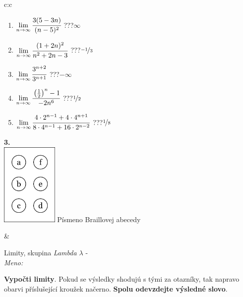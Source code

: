 \documentclass[10pt]{report}
\begin{document}
\begin{tabular}{c:c}
\begin{minipage}[c][104.5mm][t]{0.5\linewidth}
\begin{center}
\begin{minipage}{0.79\linewidth}
\begin{center}
\begin{varwidth}{\linewidth}
\begin{enumerate}
\item $\lim\limits_{n\to\infty}\cfrac{3(5-3n)}{(n-5)^2}$\quad \dotfill\; ???\;\dotfill \quad $\infty$
\item $\lim\limits_{n\to\infty}\cfrac{(1+2n)^2}{n^2+2n-3}$\quad \dotfill\; ???\;\dotfill \quad $\nicefrac{-1}{3}$
\item $\lim\limits_{n\to\infty}\cfrac{3^{n+2}}{3^{n+1}}$\quad \dotfill\; ???\;\dotfill \quad $-\infty$
\item $\lim\limits_{n\to\infty}\cfrac{\left(\frac{1}{2}\right)^n -1}{-2n^{6}}$\quad \dotfill\; ???\;\dotfill \quad $\nicefrac{1}{2}$
\item $\lim\limits_{n\to\infty}\cfrac{4\cdot 2^{n-1}+4\cdot 4^{n+1}}{8\cdot 4^{n-1}+16\cdot 2^{n-2}}$\quad \dotfill\; ???\;\dotfill \quad $\nicefrac{1}{8}$
\end{enumerate}
\end{varwidth}
\end{center}
\end{minipage}
\begin{minipage}{0.20\linewidth}
\begin{center}
{\Huge\bfseries 3.} \\[2mm]
\includegraphics[height=40mm]{../images/braille.png}
{\small Písmeno Braillovej abecedy}
\end{center}
\end{minipage}
\end{center}
\end{minipage}
&
\begin{minipage}[c][104.5mm][t]{0.5\linewidth}
\begin{center}
\vspace{7mm}
{\huge Limity, skupina \textit{Lambda $\lambda$} -}\\[5mm]
\textit{Meno:}\phantom{xxxxxxxxxxxxxxxxxxxxxxxxxxxxxxxxxxxxxxxxxxxxxxxxxxxxxxxxxxxxxxxxx}\\[5mm]
\begin{minipage}{0.95\linewidth}
\begin{center}
\textbf{Vypočti limity}. Pokud se výsledky shodujú s tými za otazníky, tak napravo\\obarvi příslušející kroužek načerno. \textbf{Spolu odevzdejte výsledné slovo}.

\end{center}
\end{minipage}
\end{center}
\end{minipage}
\end{tabular}
\end{document}
